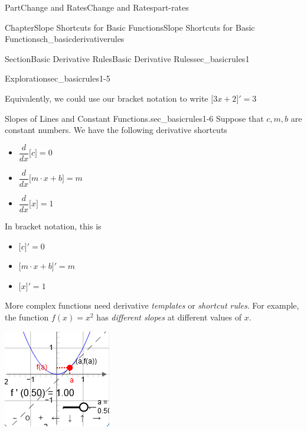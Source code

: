 \documentclass{tufte-book}
\numberwithin{equation}{chapter}
\newcommand{\ddx}[1]{ \dfrac{d}{dx} \Big[ #1 \Big]  }
\newcommand{\D}[1]{ \Big[ #1 \Big]'  }
\begin{document}
\begin{partptx}{Part}{Change and Rates}{}{Change and Rates}{}{}{part-rates}
\begin{chapterptx}{Chapter}{Slope Shortcuts for Basic Functions}{}{Slope Shortcuts for Basic Functions}{}{}{ch_basicderivativerules}
\begin{sectionptx}{Section}{Basic Derivative Rules}{}{Basic Derivative Rules}{}{}{sec_basicrules1}
\begin{exploration}{Exploration}{}{sec_basicrules1-5}
\par
Equivalently, we could use our bracket notation to write \(\D{ 3x + 2} = 3\)%
\end{exploration}%
\begin{paragraphs}{Slopes of Lines and Constant Functions.}{sec_basicrules1-6}%
Suppose that \(c,m,b\) are constant numbers.  We have the following derivative shortcuts%
%
\begin{itemize}[label=\textbullet]
\item{}\(\displaystyle \ddx{c} = 0\)%
\item{}\(\displaystyle \ddx{m\cdot x + b} = m\)%
\item{}\(\displaystyle \ddx{x} = 1\)%
\end{itemize}
 In bracket notation, this is %
\begin{itemize}[label=\textbullet]
\item{}\(\displaystyle \D{c} = 0\)%
\item{}\(\displaystyle \D{m\cdot x + b} = m\)%
\item{}\(\displaystyle \D{x} = 1\)%
\end{itemize}
\end{paragraphs}%
\par\medskip
More complex functions need derivative \emph{templates} or \emph{shortcut rules}. For example, the function \(f(x) = x^2\) has \emph{different slopes} at different values of \(x\). \begin{sidebyside}{2}{0.075}{0.075}{0.17}%
\begin{sbspanel}{0.47}%
\includegraphics[width=\linewidth]{external/jsxgraph-findingslopefromtangent-exercise2b.png}

\end{sbspanel}
\end{sidebyside}
\end{sectionptx}
\end{chapterptx}
\end{partptx}
\end{document}
